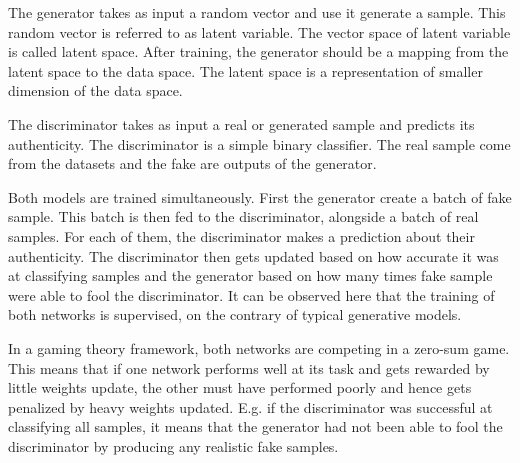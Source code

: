 \documentclass[11pt,a4paper,twoside]{report}
\begin{document}
The generator takes as input a random vector and use it generate a sample. This random vector is referred to as latent variable. The vector space of latent variable is called latent space. After training, the generator should be a mapping from the latent space to the data space. The latent space is  a representation of smaller dimension of the data space.

The discriminator takes as input a real or generated sample and predicts its authenticity. The discriminator is a simple binary classifier. The real sample come from the datasets and the fake are outputs of the generator.

Both models are trained simultaneously. First the generator create a batch of fake sample. This batch is then fed to the discriminator, alongside a batch of real samples. For each of them, the discriminator makes a prediction about their authenticity. The discriminator then gets updated based on how accurate it was at classifying samples and the generator based on how many times fake sample were able to fool the discriminator. It can be observed here that the training of both networks is supervised, on the contrary of typical generative models.

In a gaming theory framework, both networks are competing in a zero-sum game. This means that if one network performs well at its task and gets rewarded by little weights update, the other must have performed poorly and hence gets penalized by heavy weights updated. E.g. if the discriminator was successful at classifying all samples, it means that the generator had not been able to fool the discriminator by producing any realistic fake samples.  




\end{document}
